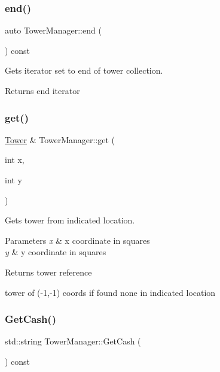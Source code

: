 \subsubsection{\texorpdfstring{end()}{end()}}
{\footnotesize\ttfamily auto Tower\+Manager\+::end (\begin{DoxyParamCaption}{ }\end{DoxyParamCaption}) const\hspace{0.3cm}{\ttfamily [inline]}}



Gets iterator set to end of tower collection. 

\begin{DoxyReturn}{Returns}
end iterator 
\end{DoxyReturn}
\mbox{\label{class_tower_manager_a05e8e2670b1b58f3d4f9851f431f08bc}} 
\subsubsection{\texorpdfstring{get()}{get()}}
{\footnotesize\ttfamily \mbox{\hyperlink{class_tower}{Tower}} \& Tower\+Manager\+::get (\begin{DoxyParamCaption}\item[{int}]{x,  }\item[{int}]{y }\end{DoxyParamCaption})}



Gets tower from indicated location. 


\begin{DoxyParams}{Parameters}
{\em x} & x coordinate in squares \\
\hline
{\em y} & y coordinate in squares \\
\hline
\end{DoxyParams}
\begin{DoxyReturn}{Returns}
tower reference 

tower of (-\/1,-\/1) coords if found none in indicated location 
\end{DoxyReturn}
\mbox{\label{class_tower_manager_ae449833a3d381d3d616c35b1489ecd55}} 
\subsubsection{\texorpdfstring{Get\+Cash()}{GetCash()}}
{\footnotesize\ttfamily std\+::string Tower\+Manager\+::\+Get\+Cash (\begin{DoxyParamCaption}{ }\end{DoxyParamCaption}) const}



